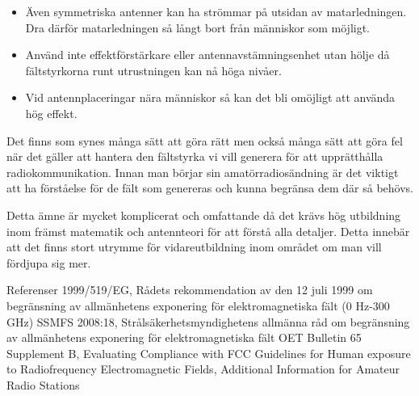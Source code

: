 \begin{itemize}
\item Även symmetriska antenner kan ha strömmar på utsidan av
matarledningen. Dra därför matarledningen så långt bort från människor
som möjligt.

\item Använd inte effektförstärkare eller antennavstämningsenhet utan
hölje då fältstyrkorna runt utrustningen kan nå höga nivåer.

\item Vid antennplaceringar nära människor så kan det bli omöjligt att
använda hög effekt.
\end{itemize}

Det finns som synes många sätt att göra rätt men också många sätt att
göra fel när det gäller att hantera den fältstyrka vi vill generera
för att upprätthålla radiokommunikation. Innan man börjar sin
amatörradiosändning är det viktigt att ha förståelse för de fält
som genereras och kunna begränsa dem där så behövs.

Detta ämne är mycket komplicerat och omfattande då det krävs hög
utbildning inom främst matematik och antennteori för att förstå alla
detaljer. Detta innebär att det finns stort utrymme för
vidareutbildning inom området om man vill fördjupa sig mer.


Referenser
1999/519/EG, Rådets rekommendation av den 12 juli 1999 om begränsning av allmänhetens exponering för
elektromagnetiska fält (0 Hz-300 GHz)
SSMFS 2008:18, Strålsäkerhetsmyndighetens allmänna råd om begränsning av allmänhetens exponering för
elektromagnetiska fält
OET Bulletin 65 Supplement B, Evaluating Compliance with FCC Guidelines for Human exposure to
Radiofrequency Electromagnetic Fields, Additional Information for Amateur Radio Stations

